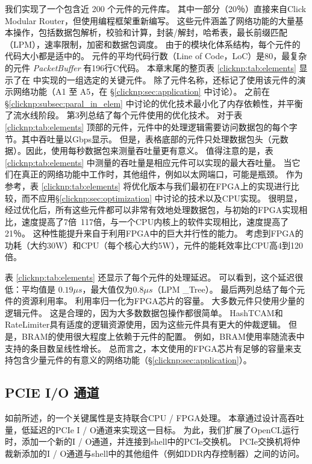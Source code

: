 我们实现了一个包含近 200 个元件的\name 元件库。
其中一部分（20％）直接来自Click Modular Router，但使用\name 编程框架重新编写。
这些元件涵盖了网络功能的大量基本操作，包括数据包解析，校验和计算，封装/解封，哈希表，最长前缀匹配（LPM），速率限制，加密和数据包调度。
由于\name 的模块化体系结构，每个元件的代码大小都是适中的。
元件的平均代码行数（Line of Code，LoC）是80，最复杂的元件 \textit {PacketBuffer} 有196行C代码。
本章末尾的整页表 \ref {clicknp:tab:elements} 显示了在 \name 中实现的一组选定的关键元件。
除了元件名称，还标记了使用该元件的演示网络功能（A1 至 A5，在 \S \ref {clicknp:sec:application} 中讨论）。
之前在 \S \ref {clicknp:subsec:paral_in_elem} 中讨论的优化技术最小化了内存依赖性，并平衡了流水线阶段。
第3列总结了每个元件使用的优化技术。
对于表 \ref {clicknp:tab:elements} 顶部的元件，元件中的处理逻辑需要访问数据包的每个字节。其中吞吐量以Gbps显示。
但是，表格底部的元件只处理数据包头（元数据）。因此，使用每秒数据包来测量吞吐量更有意义。
值得注意的是，表 \ref {clicknp:tab:elements} 中测量的吞吐量是相应元件可以实现的最大吞吐量。
当它们在真正的网络功能中工作时，其他组件，例如以太网端口，可能是瓶颈。
作为参考，表 \ref {clicknp:tab:elements} 将优化版本与我们最初在FPGA上的实现进行比较，而不应用\S \ref {clicknp:sec:optimization} 中讨论的技术以及CPU实现。
很明显，经过优化后，所有这些元件都可以非常有效地处理数据包，与初始的FPGA实现相比，速度提高了7倍~117倍，与一个CPU内核上的软件实现相比，速度提高了21％。
这种性能提升来自于利用FPGA中的巨大并行性的能力。
考虑到FPGA的功耗（大约30W）和CPU（每个核心大约5W），\name 元件的能耗效率比CPU高4到120倍。

表 \ref {clicknp:tab:elements} 还显示了每个元件的处理延迟。
可以看到，这个延迟很低：平均值是 $0.19 \mu s$，最大值仅为$0.8 \mu s$（LPM \_Tree）。
最后两列总结了每个元件的资源利用率。 利用率归一化为FPGA芯片的容量。
大多数元件只使用少量的逻辑元件。
这是合理的，因为大多数数据包操作都很简单。
HashTCAM和RateLimiter具有适度的逻辑资源使用，因为这些元件具有更大的仲裁逻辑。
但是，BRAM的使用很大程度上依赖于元件的配置。 例如，BRAM使用率随流表中支持的条目数呈线性增长。
总而言之，本文使用的FPGA芯片有足够的容量来支持包含少量元件的有意义的网络功能（\S \ref{clicknp:sec:application}）。



\subsection{PCIE I/O 通道}
\label{clicknp:subsec:pcie}

如前所述，\name 的一个关键属性是支持联合CPU / FPGA处理。
本章通过设计高吞吐量，低延迟的PCIe I / O通道来实现这一目标。
为此，我们扩展了OpenCL运行时，添加一个新的I / O通道，并连接到shell中的PCIe交换机。
PCIe交换机将仲裁新添加的I / O通道与shell中的其他组件（例如DDR内存控制器）之间的访问。

